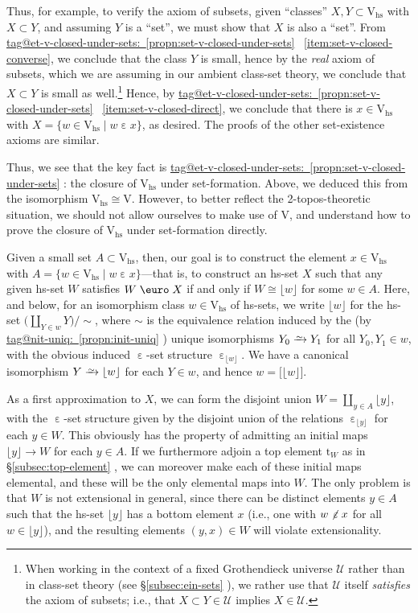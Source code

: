 \documentclass{amsart}
\makeatletter
\newcommand\cU{\mathcal{U}}
\newcommand\Ein{\mathrel{\text{\textup{\euro}}}}
\newcommand\ein{\mathrel{\varepsilon}}
\newcommand\floor[2][]{#1\lfloor #2 #1\rfloor}
\newcommand\hs{\mathrm{hs}}
\newcommand\pbig[1]{\big({#1}\big)}
\newcommand\rt{\mathrm{t}}
\newcommand\rV{\mathrm{V}}
\newcommand\set[2][]{#1\{ #2 #1\}}
\newcommand\sqbig[1]{\big[ #1 \big]}
\newcommand\toi{\xrightarrow{\raisebox{-2.5pt}[0pt][0pt]{\ensuremath{\scriptstyle{\sim}}}}}
\newcommand\unein{{\ein}}
\newcommand\unsim{{\sim}}
\newcommand\tagword[1]{\csname tag@#1\endcsname}
\def\label@tag#1:#2\@nil{#1}
\newcommand\labeltag[1]{\label@tag#1:\@nil}
\newcommand\jref[1]{%
  \texorpdfstring%
    {\hyperref[#1]{\tagword{\labeltag{#1}}~\ref*{#1}}}%
    {\tagword{\labeltag{#1}}~\ref*{#1}}%
}
\newcommand\prerefpost[3]{%
  \texorpdfstring%
    {\hyperref[#2]{#1\ref*{#2}#3}}%
    {#1\ref*{#2}#3}%
}
\newcommand\sref[1]{\prerefpost{\S}{#1}{}}
\theoremstyle{definition}
\theoremstyle{remark}
\theoremstyle{plainwithref}
\makeatother
\begin{document}
Thus, for example, to verify the axiom of subsets, given ``classes'' \( X,Y \subset \rV_\hs \) with \( X \subset Y \), and assuming \( Y \) is a ``set'', we must show that \( X \) is also a ``set''.
From \jref{propn:set-v-closed-under-sets}~\ref{item:set-v-closed-converse}, we conclude that the class \( Y \) is small, hence by the \emph{real} axiom of subsets, which we are assuming in our ambient class-set theory, we conclude that \( X \subset Y \) is small as well.\footnote{%
  When working in the context of a fixed Grothendieck universe \( \cU \) rather than in class-set theory (see \sref{subsec:ein-sets}), we rather use that \( \cU \) itself \emph{satisfies} the axiom of subsets; i.e., that \( X \subset Y \in \cU \) implies \( X \in \cU \).
}
Hence, by \jref{propn:set-v-closed-under-sets}~\ref{item:set-v-closed-direct}, we conclude that there is \( x \in \rV_\hs \) with \( X = \set{w \in \rV_\hs \mid w \ein x} \), as desired.
The proofs of the other set-existence axioms are similar.

Thus, we see that the key fact is \jref{propn:set-v-closed-under-sets}: the closure of \( \rV_\hs \) under set-formation.
Above, we deduced this from the isomorphism \( \rV_\hs \cong \rV \).
However, to better reflect the 2-topos-theoretic situation, we should not allow ourselves to make use of \( \rV \), and understand how to prove the closure of \( \rV_\hs \) under set-formation directly.

Given a small set \( A \subset \rV_\hs \), then, our goal is to construct the element \( x \in \rV_\hs \) with \( A = \set{w \in \rV_\hs \mid w \ein x} \)---that is, to construct an hs-set \( X \) such that any given hs-set \( W \) satisfies \( W \Ein X \) if and only if \( W \cong \floor{w} \) for some \( w \in A \).
Here, and below, for an isomorphism class \( w \in \rV_\hs \) of hs-sets, we write \( \floor{w} \) for the hs-set \( \pbig{\coprod_{Y \in w} Y} / \unsim \), where \( \unsim \) is the equivalence relation induced by the (by \jref{propn:init-uniq}) unique isomorphisms \( Y_0 \toi Y_1 \) for all \( Y_0, Y_1 \in w \), with the obvious induced \( \ein \)-set structure \( \ein_{\floor w} \).
We have a canonical isomorphism \( Y \toi \floor{w} \) for each \( Y \in w \), and hence \( w = \sqbig{\floor{w}} \).

As a first approximation to \( X \), we can form the disjoint union \( W = \coprod_{y \in A} \floor{y} \), with the \( \unein \)-set structure given by the disjoint union of the relations \( \unein_{\floor{y}} \) for each \( y \in W \).
This obviously has the property of admitting an initial maps \( \floor{y} \to W \) for each \( y \in A \).
If we furthermore adjoin a top element \( \rt_W \) as in \sref{subsec:top-element}, we can moreover make each of these initial maps elemental, and these will be the only elemental maps into \( W \).
The only problem is that \( W \) is not extensional in general, since there can be distinct elements \( y \in A \) such that the hs-set \( \floor{y} \) has a bottom element \( x \) (i.e., one with \( w \not\,\ein x \) for all \( w \in \floor{y} \)), and the resulting elements \( (y, x) \in W \) will violate extensionality.
\end{document}
